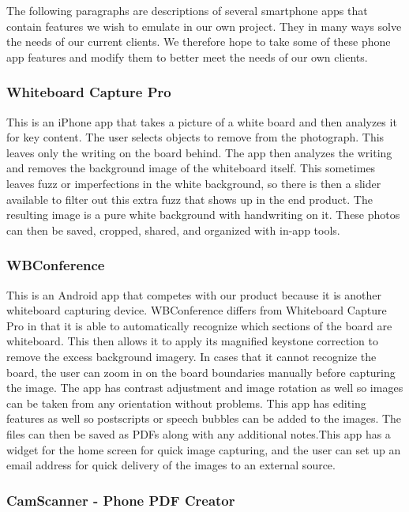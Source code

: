 \documentclass{article}
\begin{document}
The following paragraphs are descriptions of several smartphone apps that contain features we wish to emulate in our own project. They in many ways solve the needs of our current clients. We therefore hope to take some of these phone app features and modify them to better meet the needs of our own clients. \\
				\subsubsection*{Whiteboard Capture Pro}
					
This is an iPhone app that takes a picture of a white board and then analyzes it for key content. The user selects objects to remove from the photograph. This leaves only the writing on the board behind. The app then analyzes the writing and removes the background image of the whiteboard itself. This sometimes leaves fuzz or imperfections in the white background, so there is then a slider available to filter out this extra fuzz that shows up in the end product. The resulting image is a pure white background with handwriting on it. These photos can then be saved, cropped, shared, and organized with in-app tools. \cite{wcp} \\
				\subsubsection*{WBConference}
					
This is an Android app that competes with our product because it is another whiteboard capturing device. WBConference differs from Whiteboard Capture Pro in that it is able to automatically recognize which sections of the board are whiteboard. This then allows it to apply its magnified keystone correction to remove the excess background imagery. In cases that it cannot recognize the board, the user can zoom in on the board boundaries manually before capturing the image. The app has contrast adjustment and image rotation as well so images can be taken from any orientation without problems. This app has editing features as well so postscripts or speech bubbles can be added to the images. The files can then be saved as PDFs along with any additional notes.This app has a widget for the home screen for quick image capturing, and the user can set up an email address for quick delivery of the images to an external source. \cite{wbc} \\
				\subsubsection*{CamScanner - Phone PDF Creator}
					
\end{document}
